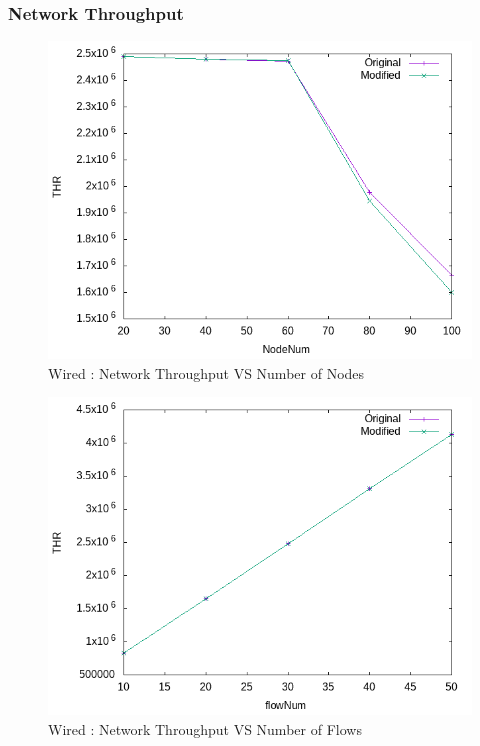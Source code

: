 
\subsubsection{Network Throughput}
    \begin{figure}[!h]
        \centering
        \includegraphics[width=.9\textwidth]{Pictures/Wired/Combined/THRVSNodeNum.png}
        \caption{Wired : Network Throughput VS Number of Nodes}
    \end{figure}
    
     \begin{figure}[!h]
        \centering
        \includegraphics[width=.9\textwidth]{Pictures/Wired/Combined/THRVSflowNum.png}
        \caption{Wired : Network Throughput VS Number of Flows}
    \end{figure}
    
